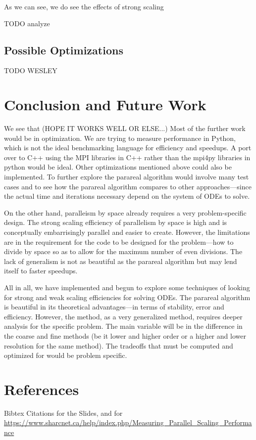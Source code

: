 \documentclass[letterpaper,twocolumn,11pt]{article}
\begin{document}
As we can see, we do see the effects of strong scaling

TODO analyze

\subsection{Possible Optimizations}

TODO WESLEY

\section{Conclusion and Future Work}

We see that (HOPE IT WORKS WELL OR ELSE...) Most of the further work would be in
optimization. We are trying to measure performance in Python, which is not the
ideal benchmarking language for efficiency and speedups. A port over to C++
using the MPI libraries in C++ rather than the mpi4py libraries in python would
be ideal. Other optimizations mentioned above could also be implemented. To
further explore the parareal algorithm would involve many test cases and to see
how the parareal algorithm compares to other approaches---since the actual time
and iterations necessary depend on the system of ODEs to solve.

On the other hand, paralleism by space already requires a very problem-specific
design. The strong scaling efficiency of parallelism by space is high and is
conceptually embarrisingly parallel and easier to create. However, the
limitations are in the requirement for the code to be designed for the
problem---how to divide by space so as to allow for the maximum number of even
divisions. The lack of generalism is not as beautiful as the parareal algorithm
but may lend itself to faster speedups.

All in all, we have implemented and begun to explore some techniques of looking
for strong and weak scaling efficiencies for solving ODEs. The parareal
algorithm is beautiful in its theoretical advantages---in terms of stability,
error and efficiency. However, the method, as a very generalized method,
requires deeper analysis for the specific problem. The main variable will be in
the difference in the coarse and fine methods (be it lower and higher order or a
higher and lower resolution for the same method). The tradeoffs that must be
computed and optimized for would be problem specific.

\section{References}

Bibtex Citations for the Slides, and for \url{https://www.sharcnet.ca/help/index.php/Measuring_Parallel_Scaling_Performance}
\end{document}

